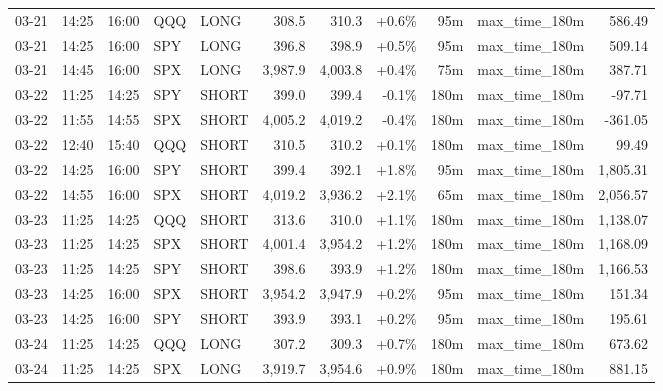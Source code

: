 \documentclass[11pt,a4paper,twoside]{article}
\begin{document}
\begin{center}
\begin{longtable}{>{\color{txtmain}}l l l l l r r r r >{\color{txtmain}}l r}
03-21 & 14:25 & 16:00 & QQQ & LONG & 308.5 & 310.3 & \textcolor{wingreen}{+0.6\%} & 95m & max\_time\_180m & \textcolor{wingreen}{586.49} \\
03-21 & 14:25 & 16:00 & SPY & LONG & 396.8 & 398.9 & \textcolor{wingreen}{+0.5\%} & 95m & max\_time\_180m & \textcolor{wingreen}{509.14} \\
03-21 & 14:45 & 16:00 & SPX & LONG & 3,987.9 & 4,003.8 & \textcolor{wingreen}{+0.4\%} & 75m & max\_time\_180m & \textcolor{wingreen}{387.71} \\
03-22 & 11:25 & 14:25 & SPY & SHORT & 399.0 & 399.4 & \textcolor{lossred}{-0.1\%} & 180m & max\_time\_180m & \textcolor{lossred}{-97.71} \\
03-22 & 11:55 & 14:55 & SPX & SHORT & 4,005.2 & 4,019.2 & \textcolor{lossred}{-0.4\%} & 180m & max\_time\_180m & \textcolor{lossred}{-361.05} \\
03-22 & 12:40 & 15:40 & QQQ & SHORT & 310.5 & 310.2 & \textcolor{wingreen}{+0.1\%} & 180m & max\_time\_180m & \textcolor{wingreen}{99.49} \\
03-22 & 14:25 & 16:00 & SPY & SHORT & 399.4 & 392.1 & \textcolor{wingreen}{+1.8\%} & 95m & max\_time\_180m & \textcolor{wingreen}{1,805.31} \\
03-22 & 14:55 & 16:00 & SPX & SHORT & 4,019.2 & 3,936.2 & \textcolor{wingreen}{+2.1\%} & 65m & max\_time\_180m & \textcolor{wingreen}{2,056.57} \\
03-23 & 11:25 & 14:25 & QQQ & SHORT & 313.6 & 310.0 & \textcolor{wingreen}{+1.1\%} & 180m & max\_time\_180m & \textcolor{wingreen}{1,138.07} \\
03-23 & 11:25 & 14:25 & SPX & SHORT & 4,001.4 & 3,954.2 & \textcolor{wingreen}{+1.2\%} & 180m & max\_time\_180m & \textcolor{wingreen}{1,168.09} \\
03-23 & 11:25 & 14:25 & SPY & SHORT & 398.6 & 393.9 & \textcolor{wingreen}{+1.2\%} & 180m & max\_time\_180m & \textcolor{wingreen}{1,166.53} \\
03-23 & 14:25 & 16:00 & SPX & SHORT & 3,954.2 & 3,947.9 & \textcolor{wingreen}{+0.2\%} & 95m & max\_time\_180m & \textcolor{wingreen}{151.34} \\
03-23 & 14:25 & 16:00 & SPY & SHORT & 393.9 & 393.1 & \textcolor{wingreen}{+0.2\%} & 95m & max\_time\_180m & \textcolor{wingreen}{195.61} \\
03-24 & 11:25 & 14:25 & QQQ & LONG & 307.2 & 309.3 & \textcolor{wingreen}{+0.7\%} & 180m & max\_time\_180m & \textcolor{wingreen}{673.62} \\
03-24 & 11:25 & 14:25 & SPX & LONG & 3,919.7 & 3,954.6 & \textcolor{wingreen}{+0.9\%} & 180m & max\_time\_180m & \textcolor{wingreen}{881.15} \\

\end{longtable}
\end{center}
\end{document}
